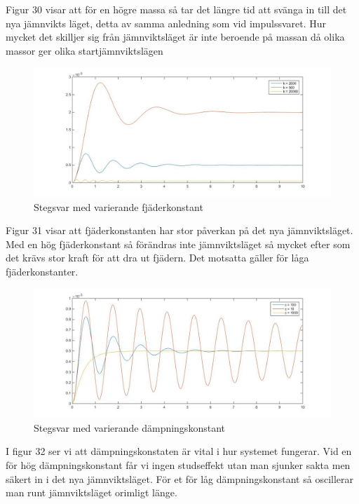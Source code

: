 \documentclass[10pt,a4paper]{article}
\begin{document}
Figur 30 visar att för en högre massa så tar det längre tid att svänga in till det nya jämnvikts läget, detta av samma anledning som vid impulssvaret. Hur mycket det skilljer sig från jämnviktsläget är inte beroende på massan då olika massor ger olika startjämnviktslägen

\begin{figure}[h]
\begin{center}
\includegraphics[scale=0.4]{stegsvar(fjader)}
\caption{Stegsvar med varierande fjäderkonstant}
\end{center}
\end{figure}

Figur 31 visar att fjäderkonstanten har stor påverkan på det nya jämnviktsläget. Med en hög fjäderkonstant så förändras inte jämnviktsläget så mycket efter som det krävs stor kraft för att dra ut fjädern. Det motsatta gäller för låga fjäderkonstanter.

\begin{figure}[h]
\begin{center}
\includegraphics[scale=0.4]{stegsvar(dampning)}
\caption{Stegsvar med varierande dämpningskonstant}
\end{center}
\end{figure}

I figur 32 ser vi att dämpningskonstaten är vital i hur systemet fungerar. Vid en för hög dämpningskonstant får vi ingen studseffekt utan man sjunker sakta men säkert in i det nya jämnviktsläget. För et för låg dämpningskonstant så oscillerar man runt jämnviktsläget orimligt länge.
\end{document}
